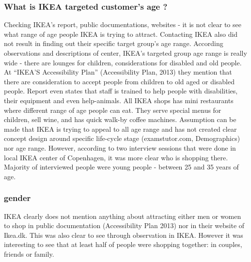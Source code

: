 \subsubsection{What is IKEA targeted customer's age ?}
Checking IKEA’s report, public documentations, websites -  it is not clear to see what range of age people IKEA is trying to attract. Contacting IKEA also did not result in finding out their specific target group’s age range. According observations and descriptions of center, IKEA’s targeted group age range is really wide - there are lounges for children, considerations for disabled and old people. At “IKEA’S Accessibility Plan” (Accessibility Plan, 2013) they mention that there are consideration to accept people from children to old aged or disabled people. Report even states that staff is trained to help people with disabilities, their equipment and even help-animals. All IKEA shops has mini restaurants where different range of age people can eat. They serve special menus for children, sell wine, and has quick walk-by coffee machines. Assumption can be made that IKEA is trying to appeal to all age range and has not created clear concept design around specific life-cycle stage (examstutor.com, Demographics) nor age range. 
However, according to two interview sessions that were done in local IKEA center of Copenhagen, it was more clear who is shopping there. Majority of interviewed people were young people - between 25 and 35 years of age.

\subsubsection{gender}
IKEA clearly does not mention anything about attracting either men or women to shop in public documentation (Accessibility Plan 2013) nor in their website of Ikea.dk. This was also clear to see through observation in IKEA. However it was interesting to see that at least half of people were shopping together: in couples, friends or family. 
